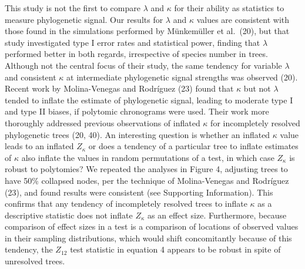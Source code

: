 \documentclass[9pt,twocolumn,twoside,lineno]{pnas-new}
\begin{document}
This study is not the first to compare \(\lambda\) and \(\kappa\) for
their ability as statistics to measure phylogenetic signal. Our results
for \(\lambda\) and \(\kappa\) values are consistent with those found in
the simulations performed by Münkemüller et al.~(20), but that study
investigated type I error rates and statistical power, finding that
\(\lambda\) performed better in both regards, irrespective of species
number in trees. Although not the central focus of their study, the same
tendency for variable \(\lambda\) and consistent \(\kappa\) at
intermediate phylogenetic signal strengths was observed (20). Recent
work by Molina-Venegas and Rodríguez (23) found that \(\kappa\) but not
\(\lambda\) tended to inflate the estimate of phylogenetic signal,
leading to moderate type I and type II biases, if polytomic chronograms
were used. Their work more thoroughly addressed previous observations of
inflated \(\kappa\) for incompletely resolved phylogenetic trees (20,
40). An interesting question is whether an inflated \(\kappa\) value
leads to an inflated \(Z_\kappa\) or does a tendency of a particular
tree to inflate estimates of \(\kappa\) also inflate the values in
random permutations of a test, in which case \(Z_\kappa\) is robust to
polytomies? We repeated the analyses in Figure 4, adjusting trees to
have 50\% collapsed nodes, per the technique of Molina-Venegas and
Rodríguez (23), and found results were consistent (see Supporting
Information). This confirms that any tendency of incompletely resolved
trees to inflate \(\kappa\) as a descriptive statistic does not inflate
\(Z_\kappa\) as an effect size. Furthermore, because comparison of
effect sizes in a test is a comparison of locations of observed values
in their sampling distributions, which would shift concomitantly because
of this tendency, the \(Z_{12}\) test statistic in equation 4 appears to
be robust in spite of unresolved trees.
\end{document}
